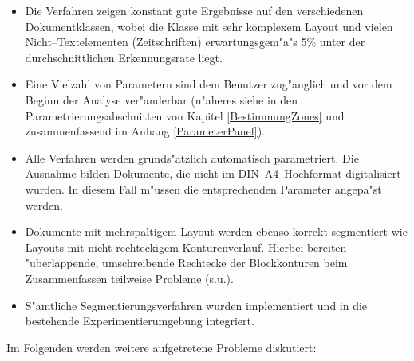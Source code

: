 \begin{itemize}
  \item Die Verfahren zeigen konstant gute Ergebnisse auf den verschiedenen Dokumentklassen, wobei
  die Klasse mit sehr komplexem Layout und vielen Nicht--Textelementen (Zeitschriften)
  erwartungsgem"a"s 5\% unter der durchschnittlichen Erkennungsrate liegt.
  
  \item Eine Vielzahl von Parametern sind dem Benutzer zug"anglich und vor dem Beginn der Analyse
  ver"anderbar (n"aheres siehe in den Parametrierungsabschnitten von Kapitel \ref{BestimmungZones}
  und zusammenfassend im Anhang \ref{ParameterPanel}).

  \item Alle Verfahren werden grunds"atzlich automatisch parametriert. Die Ausnahme bilden
  Dokumente, die nicht im DIN--A4--Hochformat digitalisiert wurden. In diesem Fall m"ussen die
  entsprechenden Parameter angepa"st werden.
  
  \item Dokumente mit mehrspaltigem Layout werden ebenso korrekt segmentiert wie Layouts mit 
  nicht rechteckigem Konturenverlauf. Hierbei bereiten "uberlappende, umschreibende Rechtecke der
  Blockkonturen beim Zusammenfassen teilweise Probleme (s.u.).
  
  \item S"amtliche Segmentierungsverfahren wurden implementiert und in die bestehende
  Experimentierumgebung integriert.

\end{itemize}
\newpage
Im Folgenden werden weitere aufgetretene Probleme diskutiert:
